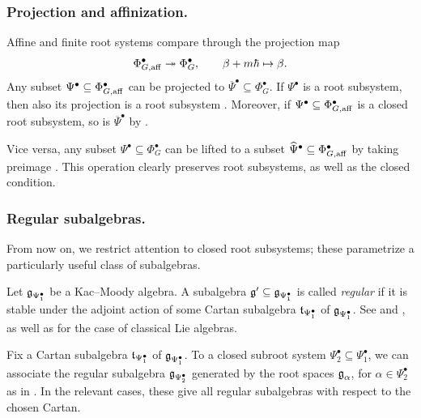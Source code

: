 \subsubsection{Projection and affinization.}\label{section: projection and affinization}
Affine and finite root systems compare through the projection map 
\begin{equation}\label{equation: projection of root systems}
\Phi^{\bullet}_{G, \mathrm{aff}} \twoheadrightarrow \Phi^{\bullet}_G, \qquad \beta + m\hbar \mapsto \beta.    
\end{equation}
Any subset $\Psi^{\bullet} \subseteq \Phi^{\bullet}_{G, \mathrm{aff}}$ can be projected to $\overline{\Psi}^{\bullet} \subseteq \Phi^{\bullet}_G$. If $\Psi^{\bullet}$ is a root subsystem, then also its projection is a root subsystem \cite[Definition 2.4.3]{RV19}. Moreover, if $\Psi^{\bullet} \subseteq \Phi^{\bullet}_{G, \mathrm{aff}}$ is a closed root subsystem, so is $\overline{\Psi}^{\bullet}$ by \cite[Proposition 4.1.1]{RV19}.

Vice versa, any subset $\Psi^{\bullet} \subseteq \Phi^{\bullet}_G$ can be lifted to a subset $ \widehat{\Psi}^{\bullet} \subseteq \Phi^{\bullet}_{G, \mathrm{aff}}$ by taking preimage \cite[Definition 2.4.4]{RV19}. This operation clearly preserves root subsystems, as well as the closed condition.



\subsubsection{Regular subalgebras.} 
From now on, we restrict attention to closed root subsystems; these parametrize a particularly useful class of subalgebras.
\begin{notation}
Let $\operatorname{\mathfrak{g}}_{\Psi^{\bullet}_1}$ be a Kac--Moody algebra. A subalgebra $\operatorname{\mathfrak{g}}' \subseteq \operatorname{\mathfrak{g}}_{\Psi^{\bullet}_1}$ is called \emph{regular} if it is stable under the adjoint action of some Cartan subalgebra $\operatorname{\mathfrak{t}}_{\Psi^{\bullet}_1}$ of $\operatorname{\mathfrak{g}}_{\Psi^{\bullet}_1}$. 
See \cite[Definition 12.1.3 and text below]{RV19} and \cite[\S 1]{FRT08}, as well as \cite[Chapter II, \S 2]{Dyn57} for the case of classical Lie algebras.
\end{notation}

Fix a Cartan subalgebra $\operatorname{\mathfrak{t}}_{\Psi^{\bullet}_1}$ of $\operatorname{\mathfrak{g}}_{\Psi^{\bullet}_1}$.
To a closed subroot system $\Psi^{\bullet}_2 \subseteq \Psi^{\bullet}_1$, we can associate the regular subalgebra $\operatorname{\mathfrak{g}}_{\Psi^{\bullet}_2}$ generated by the root spaces $\operatorname{\mathfrak{g}}_{\alpha}$, for $\alpha \in \Psi^{\bullet}_2$ as in \cite[Definition 12.1.3 and below]{RV19}. 
In the relevant cases, these give all regular subalgebras with respect to the chosen Cartan.



